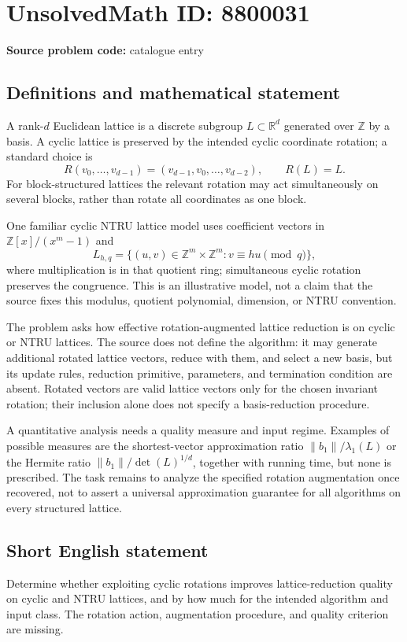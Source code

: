 \documentclass[11pt]{article}
\newcommand{\Z}{\mathbb{Z}}
\newcommand{\R}{\mathbb{R}}
\begin{document}
\section*{UnsolvedMath ID: 8800031}
\textbf{Source problem code:} catalogue entry
\subsection{Definitions and mathematical statement}
A rank-$d$ Euclidean lattice is a discrete subgroup $L\subset\R^d$ generated over $\Z$ by a basis. A cyclic lattice is preserved by the intended cyclic coordinate rotation; a standard choice is
\[
 R(v_0,\ldots,v_{d-1})=(v_{d-1},v_0,\ldots,v_{d-2}),
 \qquad R(L)=L.
\]
For block-structured lattices the relevant rotation may act simultaneously on several blocks, rather than rotate all coordinates as one block.

One familiar cyclic NTRU lattice model uses coefficient vectors in $\Z[x]/(x^m-1)$ and
\[
 L_{h,q}=\{(u,v)\in\Z^m\times\Z^m:
                v\equiv h u\pmod q\},
\]
where multiplication is in that quotient ring; simultaneous cyclic rotation preserves the congruence. This is an illustrative model, not a claim that the source fixes this modulus, quotient polynomial, dimension, or NTRU convention.

The problem asks how effective rotation-augmented lattice reduction is on cyclic or NTRU lattices. The source does not define the algorithm: it may generate additional rotated lattice vectors, reduce with them, and select a new basis, but its update rules, reduction primitive, parameters, and termination condition are absent. Rotated vectors are valid lattice vectors only for the chosen invariant rotation; their inclusion alone does not specify a basis-reduction procedure.

A quantitative analysis needs a quality measure and input regime. Examples of possible measures are the shortest-vector approximation ratio $\|b_1\|/\lambda_1(L)$ or the Hermite ratio $\|b_1\|/\det(L)^{1/d}$, together with running time, but none is prescribed. The task remains to analyze the specified rotation augmentation once recovered, not to assert a universal approximation guarantee for all algorithms on every structured lattice.
\subsection{Short English statement}
Determine whether exploiting cyclic rotations improves lattice-reduction quality on cyclic and NTRU lattices, and by how much for the intended algorithm and input class. The rotation action, augmentation procedure, and quality criterion are missing.
\end{document}
